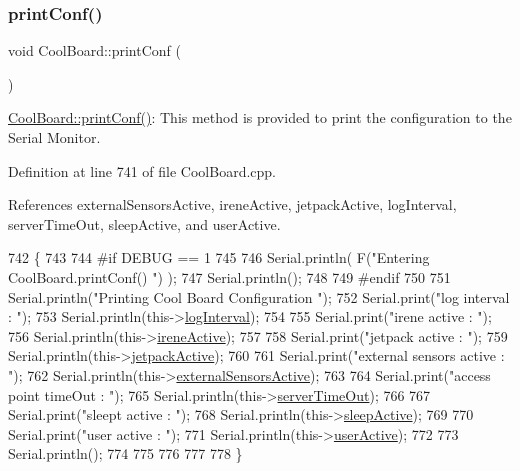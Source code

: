 \mbox{\label{classCoolBoard_a486507b8f0981d3cc671ed31c2145755}} 
\subsubsection{\texorpdfstring{print\+Conf()}{printConf()}}
{\footnotesize\ttfamily void Cool\+Board\+::print\+Conf (\begin{DoxyParamCaption}{ }\end{DoxyParamCaption})}

\hyperlink{classCoolBoard_a486507b8f0981d3cc671ed31c2145755}{Cool\+Board\+::print\+Conf()}\+: This method is provided to print the configuration to the Serial Monitor. 

Definition at line 741 of file Cool\+Board.\+cpp.



References external\+Sensors\+Active, irene\+Active, jetpack\+Active, log\+Interval, server\+Time\+Out, sleep\+Active, and user\+Active.


\begin{DoxyCode}
742 \{
743 
744 \textcolor{preprocessor}{#if DEBUG == 1}
745     
746     Serial.println( F(\textcolor{stringliteral}{"Entering CoolBoard.printConf() "}) );
747     Serial.println();
748 
749 \textcolor{preprocessor}{#endif}
750 
751     Serial.println(\textcolor{stringliteral}{"Printing Cool Board Configuration "});
752     Serial.print(\textcolor{stringliteral}{"log interval      : "});
753     Serial.println(this->\hyperlink{classCoolBoard_a84bc94413b64973e4aba8c467c97006c}{logInterval});
754 
755     Serial.print(\textcolor{stringliteral}{"irene active      : "});
756     Serial.println(this->\hyperlink{classCoolBoard_a9c3f7ac625481ee2ae802a25d97a4ae0}{ireneActive});
757 
758     Serial.print(\textcolor{stringliteral}{"jetpack active        : "});
759     Serial.println(this->\hyperlink{classCoolBoard_a9be03a913d26e558328935ca3b59a75e}{jetpackActive});
760 
761     Serial.print(\textcolor{stringliteral}{"external sensors active   : "});
762     Serial.println(this->\hyperlink{classCoolBoard_a638b00b76aeb819ecfd4c10b8cdd7bb7}{externalSensorsActive});
763 
764     Serial.print(\textcolor{stringliteral}{"access point timeOut  : "});
765     Serial.println(this->\hyperlink{classCoolBoard_a7a8d8d3d316220cdd049cd63c1aa8fe6}{serverTimeOut});
766 
767     Serial.print(\textcolor{stringliteral}{"sleept active         : "});
768     Serial.println(this->\hyperlink{classCoolBoard_a0a51b2287139f66c738101fb53139230}{sleepActive});
769 
770     Serial.print(\textcolor{stringliteral}{"user active       : "});
771     Serial.println(this->\hyperlink{classCoolBoard_a6395459131d6889a3005f79c7a35e964}{userActive});
772 
773     Serial.println();
774 
775 
776 
777 
778 \}
\end{DoxyCode}
\mbox{\label{classCoolBoard_ad03abdce2e65f520bbf2cff0f2d083cf}} 
